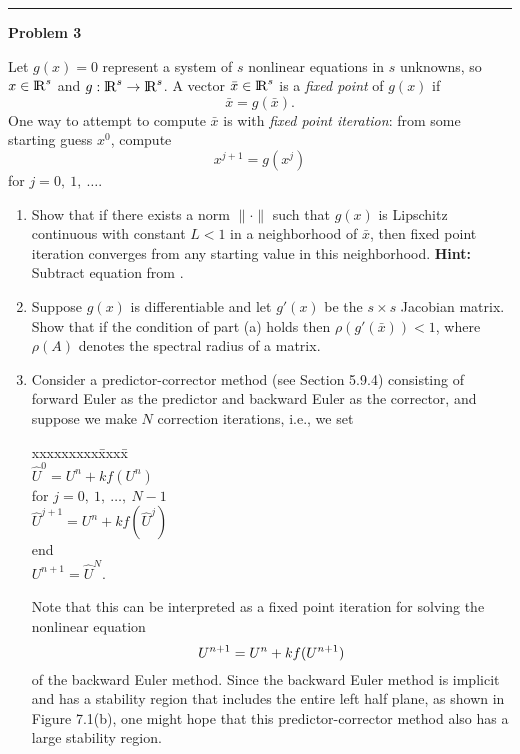 \documentclass[10pt]{article}
\begin{document}
\vskip 1cm
\hrule
{\bf Problem 3}


Let $g(x)=0$ represent a system of $s$ nonlinear equations in $s$ unknowns,
so $x\in{{\rm l} \kern -.15em {\rm R} }^s$ and $g: {{\rm l} \kern -.15em {\rm R} }^s \rightarrow {{\rm l} \kern -.15em {\rm R} }^s$.  A vector $\bar
x\in{{\rm l} \kern -.15em {\rm R} }^s$ is a {\em fixed point} of $g(x)$ if 
\begin{equation}\label{a}
\bar x = g(\bar x).
\end{equation}
One way to attempt to compute $\bar x$ is with {\em fixed point iteration}:
from some starting guess $x^0$, compute
\begin{equation}\label{b}
x^{j+1} = g(x^j)
\end{equation}
for $j=0,~1,~\ldots$.

\begin{enumerate}
\item Show that if there exists a norm $\|\cdot\|$ such that $g(x)$ is
Lipschitz continuous with constant $L<1$ in a neighborhood of $\bar x$, then
fixed point iteration converges from any starting value in this
neighborhood.
{\bf Hint:} Subtract equation  from .

\item Suppose $g(x)$ is differentiable and let $g'(x)$ be the $s\times s$
Jacobian matrix.  Show that if the condition of part (a) holds then
$\rho(g'(\bar x)) < 1$, where $\rho(A)$ denotes the spectral radius of a
matrix.

\newpage
\item Consider a predictor-corrector method (see Section 5.9.4) consisting
of forward Euler as the predictor and backward Euler as the corrector, and
suppose we make $N$ correction iterations, i.e., we set
\begin{tabbing}
xxxxxxxxx\=xxxx\=\kill\\
\>$\hat U^0 = U^n + kf(U^n)$\\
\>for $j = 0,~1,~\ldots,~N-1$\\
\>\>$\hat U^{j+1} = U^n + kf(\hat U^j)$\\
\>\>end\\
\>$U^{n+1} = \hat U^N$.
\end{tabbing}
Note that this can be interpreted as a fixed point iteration for solving the
nonlinear equation
\[
U^{n+1} = U^n + kf(U^{n+1})
\]
of the backward Euler method.  Since the backward Euler method is implicit
and has a stability region that includes the entire left half plane, as
shown in Figure 7.1(b), one might hope that this predictor-corrector method
also has a large stability region.


\end{enumerate}
\end{document}

